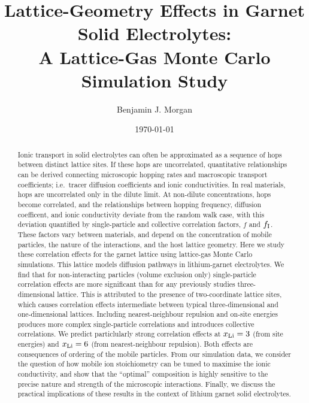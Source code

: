 \documentclass[aps,prb,twocolumn,superscriptaddress,reprint]{revtex4-1}
\newcommand{\xLi}{x_\m{Li}}
\begin{document}
\title{Lattice-Geometry Effects in Garnet Solid Electrolytes:\\ A Lattice-Gas Monte Carlo Simulation Study}
\author{Benjamin J. Morgan}

\date{\today}

\begin{abstract}
Ionic transport in solid electrolytes can often be approximated as a sequence of hops between distinct lattice sites. If these hops are uncorrelated, quantitative relationships can be derived connecting microscopic hopping rates and macroscopic transport coefficients; i.e.\ tracer diffusion coefficients and ionic conductivities. In real materials, hops are uncorrelated only in the dilute limit. At non-dilute concentrations, hops become correlated, and the relationships between hopping frequency, diffusion coefficent, and ionic conductivity deviate from the random walk case, with this deviation quantified by single-particle and collective correlation factors, $f$ and $f_{\mathrm{I}}$. These factors vary between materials, and depend on the concentration of mobile particles, the nature of the interactions, and the host lattice geometry. 
Here we study these correlation effects for the garnet lattice using lattice-gas Monte Carlo simulations. This lattice models diffusion pathways in lithium-garnet electrolytes. We find that for non-interacting particles (volume exclusion only) single-particle correlation effects are more significant than for any previously studies three-dimensional lattice. This is attributed to the presence of two-coordinate lattice sites, which causes correlation effects intermediate between typical three-dimensional and one-dimensional lattices. Including nearest-neighbour repulsion and on-site energies produces more complex single-particle correlations and introduces collective correlations. We predict particlularly strong correlation effects at $\xLi=3$ (from site energies) and $\xLi=6$ (from nearest-neighbour repulsion). Both effects are consequences of ordering of the mobile particles. From our simulation data, we consider the question of how mobile ion stoichiometry can be tuned to maximise the ionic conductivity, and show that the ``optimal'' composition is highly sensitive to the precise nature and strength of the microscopic interactions.
Finally, we discuss the practical implications of these results in the context of lithium garnet solid electrolytes.
\end{abstract}
\end{document}
